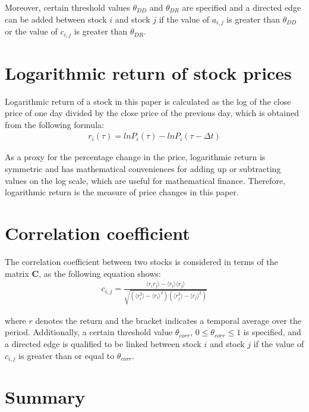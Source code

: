 Moreover, certain threshold values $\theta_{DD}$ and $\theta_{DR}$ are specified and a directed edge can be added between stock $i$ and stock $j$ if the value of $a_{i,j}$ is greater than $\theta_{DD}$ or the value of $c_{i,j}$ is greater than $\theta_{DR}$.

\section{Logarithmic return of stock prices}
Logarithmic return of a stock in this paper is calculated as the log of the close price of one day divided by the close price of the previous day, which is obtained from the following formula:
\begin{eqnarray}\label{equ:log}
r_i(\tau)=lnP_i(\tau)-lnP_i(\tau-\Delta t)
\end{eqnarray}

 As a proxy for the percentage change in the price, logarithmic return is symmetric and has mathematical conveniences for adding up or subtracting values on the log scale, which are useful for mathematical finance. Therefore, logarithmic return is the measure of price changes in this paper.

\section{Correlation coefficient}
The correlation coefficient between two stocks is considered in terms of the matrix \textbf{C}, as the following equation shows:
\begin{eqnarray}\label{equ:corr}
c_{i,j}=\frac{\langle r_ir_j \rangle-\langle r_i\rangle \langle r_j\rangle}{\sqrt{(\langle r_i^2\rangle-\langle r_i\rangle^2)(\langle r_j^2\rangle-\langle r_j\rangle^2)}}
\end{eqnarray}

where $r$ denotes the return and the bracket indicates a temporal average over the period. Additionally, a certain threshold value $\theta_{corr}$, $0\leq \theta_{corr} \leq1$ is specified, and a directed edge is qualified to be linked between stock $i$ and stock $j$ if the value of $c_{i,j}$ is greater than or equal to $\theta_{corr}$.

\section{Summary}
